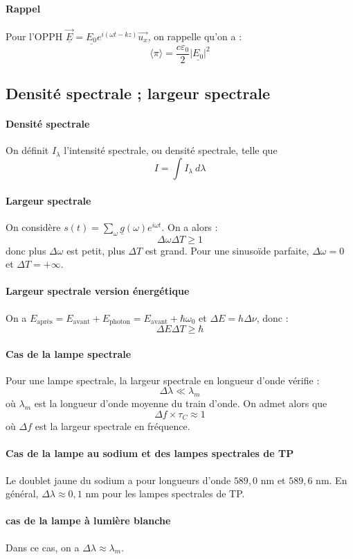 \documentclass[french]{book}
\theoremstyle{plain}
\theoremstyle{definition}
\theoremstyle{remark}
\begin{document}
\paragraph{Rappel} Pour l'OPPH $\underline{\overrightarrow{E}}=\underline{E_0}e^{i(\omega t-kz)}\overrightarrow{u_x}$, on rappelle qu'on a : $$\langle\pi\rangle =\frac{c\varepsilon_0}{2}\lvert\underline{E_0}\rvert^2$$
\subsection{Densité spectrale ; largeur spectrale}
\paragraph{Densité spectrale} On définit $I_\lambda$ l'intensité spectrale, ou densité spectrale, telle que $$I=\int I_\lambda\ d\lambda$$
\paragraph{Largeur spectrale} On considère $\displaystyle s(t)=\sum_\omega\underline{g}(\omega)e^{i\omega t}$. On a alors : $$\Delta\omega\Delta T\geqslant1$$ donc plus $\Delta\omega$ est petit, plus $\Delta T$ est grand. Pour une sinusoïde parfaite, $\Delta\omega=0$ et $\Delta T=+\infty$.
\paragraph{Largeur spectrale version énergétique} On a $E_\text{après}=E_\text{avant}+E_\text{photon}=E_\text{avant}+\hbar\omega_0$ et $\Delta E=h\Delta\nu$, donc : $$\Delta E\Delta T\geqslant\hbar$$
\paragraph{Cas de la lampe spectrale} Pour une lampe spectrale, la largeur spectrale en longueur d'onde vérifie : $$\Delta\lambda\ll\lambda_m$$ où $\lambda_m$ est la longueur d'onde moyenne du train d'onde. On admet alors que $$\Delta f\times\tau_C\approx 1$$ où $\Delta f$ est la largeur spectrale en fréquence.
\paragraph{Cas de la lampe au sodium et des lampes spectrales de TP} Le doublet jaune du sodium a pour longueurs d'onde $589,0$ nm et $589,6$ nm.  En général, $\Delta\lambda\approx0,1$ nm pour les lampes spectrales de TP.
\paragraph{cas de la lampe à lumière blanche} Dans ce cas, on a $\Delta\lambda\approx\lambda_m$.
\end{document}
